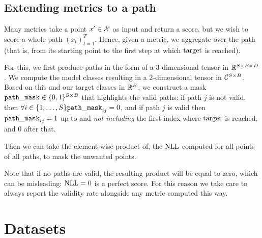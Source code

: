 \documentclass[../main.tex]{subfiles}
\begin{document}

\subsection{Extending metrics to a path}

Many metrics take a point $x' \in \mathcal{X}$ as input and return a score, but we wish to score a whole path $(x_t)_{t=1}^T$.
Hence, given a metric, we aggregate over the path (that is, from its starting point to the first step at which $\mathrm{target}$ is reached).

For this, we first produce paths in the form of a 3-dimensional tensor in $\mathbb{R}^{S \times B \times D}$.
We compute the model classes resulting in a 2-dimensional tensor in $\mathcal{C}^{S \times B}$.
Based on this and our target classes in $\mathbb{R}^B$, we construct a mask $\mathtt{path\_mask} \in \{0, 1\}^{S \times B}$ that highlights the valid paths:
if path $j$ is not valid, then
$\forall i \in \{1, \ldots, S\} \mathtt{path\_mask}_{ij} = 0$, and if path $j$ is valid then $\mathtt{path\_mask}_{ij} = 1$ up to and \emph{not including} the first index where $\mathrm{target}$ is reached, and 0 after that.

Then we can take the element-wise product of, \eg{} the $\text{NLL}$ computed for all points of all paths, to mask the unwanted points.

Note that if no paths are valid, the resulting product will be equal to zero, which can be misleading: $\text{NLL} = 0$ is a perfect score.
For this reason we take care to always report the validity rate alongside any metric computed this way.

\section{Datasets}
\label{sec:datasets}
\end{document}
